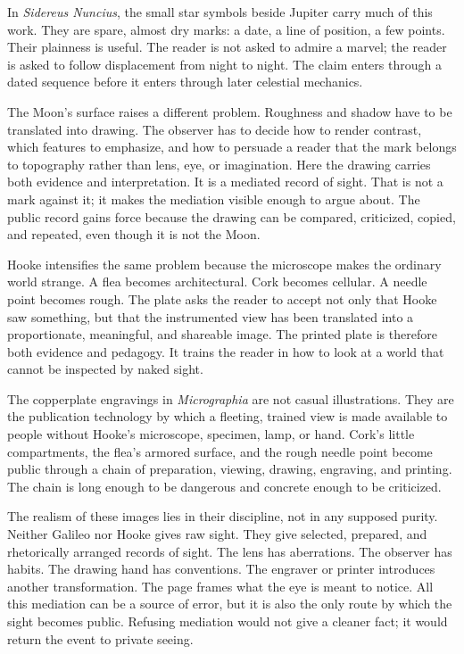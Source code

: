 In \emph{Sidereus Nuncius}, the small star symbols beside Jupiter carry
much of this work. They are spare, almost dry marks: a date, a line of
position, a few points. Their plainness is useful. The reader is not
asked to admire a marvel; the reader is asked to follow displacement
from night to night. The claim enters through a dated sequence before it
enters through later celestial mechanics.

The Moon's surface raises a different problem. Roughness and shadow have
to be translated into drawing. The observer has to decide how to render
contrast, which features to emphasize, and how to persuade a reader that
the mark belongs to topography rather than lens, eye, or imagination.
Here the drawing carries both evidence and interpretation. It is a
mediated record of sight. That is not a mark against it; it makes the
mediation visible enough to argue about. The public record gains force
because the drawing can be compared, criticized, copied, and repeated,
even though it is not the Moon.

Hooke intensifies the same problem because the microscope makes the
ordinary world strange. A flea becomes architectural. Cork becomes
cellular. A needle point becomes rough. The plate asks the reader to
accept not only that Hooke saw something, but that the instrumented view
has been translated into a proportionate, meaningful, and shareable
image. The printed plate is therefore both evidence and pedagogy. It
trains the reader in how to look at a world that cannot be inspected by
naked sight.

The copperplate engravings in \emph{Micrographia} are not casual
illustrations. They are the publication technology by which a fleeting,
trained view is made available to people without Hooke's microscope,
specimen, lamp, or hand. Cork's little compartments, the flea's armored
surface, and the rough needle point become public through a chain of
preparation, viewing, drawing, engraving, and printing. The chain is long
enough to be dangerous and concrete enough to be criticized.

The realism of these images lies in their discipline, not in any supposed
purity. Neither Galileo nor Hooke gives raw sight. They give selected,
prepared, and rhetorically arranged records of sight. The lens has
aberrations. The observer has habits. The drawing hand has conventions.
The engraver or printer introduces another transformation. The page
frames what the eye is meant to notice. All this mediation can be a
source of error, but it is also the only route by which the sight becomes
public. Refusing mediation would not give a cleaner fact; it would return
the event to private seeing.

